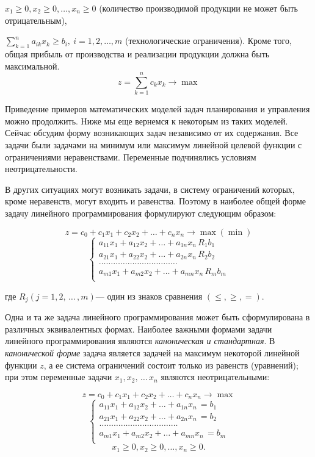 \(x_1 \geq 0 , x_2 \geq 0 , \dots , x_n \geq 0 \) (количество производимой продукции не может быть отрицательным),

\(\sum\limits_{k=1}^n a_{ik} x_k \geq b_i ,\: i=1,2, \dots, m\) (технологические ограничения).
Кроме того, общая прибыль от производства и реализации продукции должна быть максимальной.
$$
z=\sum\limits_{k=1}^n c_k x_k \rightarrow \max
$$

Приведение примеров математических моделей задач планирования и управления можно продолжить. Ниже мы еще вернемся к некоторым из таких моделей. Сейчас обсудим форму возникающих задач независимо от их содержания. Все задачи были задачами на минимум или максимум линейной целевой функции с ограничениями неравенствами. Переменные подчинялись условиям неотрицательности.

В других ситуациях могут возникать задачи, в систему ограничений которых, кроме неравенств, могут входить и равенства. Поэтому в наиболее общей форме задачу линейного программирования формулируют следующим образом:


\[z=c_0+c_1x_1+c_2x_2+\dots+c_nx_n \rightarrow \max (\min)\]
$$
\left\{
\begin{array}{ll}
	a_{11}x_1+a_{12}x_2+\dots+a_{1n}x_n \, R_1 b_1 \\
	a_{21}x_1+a_{22}x_2+\dots+a_{2n}x_n \, R_2 b_2 \\
	\dots\dots\dots\dots\dots\dots\dots\dots\dots\dots\dots\\
	a_{m1}x_1+a_{m2}x_2+\dots+a_{mn}x_n \, R_m b_m \\
\end{array}
\right.
$$

где $R_j (j=1, 2,\,\dots\,, m)$— один из знаков сравнения $(\leq, \geq, = )$.

Одна и та же задача линейного программирования может быть сформулирована в различных эквивалентных формах. Наиболее важными формами задачи линейного программирования являются \textit{каноническая и стандартная}.
В \textit{канонической форме} задача является задачей на максимум некоторой линейной функции $z$, а ее система ограничений состоит только из равенств (уравнений); при этом переменные задачи $x_1, x_2, \,\dots\, x_n$ являются неотрицательными:

\[z=c_0+c_1x_1+c_2x_2+\dots+c_nx_n \rightarrow \max \]
$$
\left\{
\begin{array}{ll}
	a_{11}x_1+a_{12}x_2+\dots+a_{1n}x_n \,= b_1 \\
	a_{21}x_1+a_{22}x_2+\dots+a_{2n}x_n \,= b_2 \\
	\dots\dots\dots\dots\dots\dots\dots\dots\dots\dots\dots\\
	a_{m1}x_1+a_{m2}x_2+\dots+a_{mn}x_n \,= b_m \\
\end{array}
\right.
$$
\[x_1\geq 0, x_2 \geq 0, \dots, x_n \geq 0.\]

